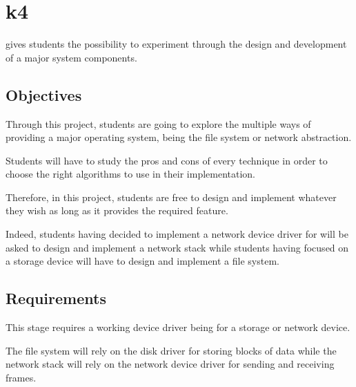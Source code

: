 %
%
%
%
%
%

%
%

\chapter{k4}
\label{chapter:k4}

 gives students the possibility to experiment through the design
and development of a major system components.

\newpage

%
%

%
%

\section{Objectives}

Through this project, students are going to explore the multiple ways of
providing a major operating system, being the file system or network
abstraction.

Students will have to study the pros and cons of every technique in order to
choose the right algorithms to use in their implementation.

Therefore, in this project, students are free to design and implement whatever
they wish as long as it provides the required feature.

Indeed, students having decided to implement a network device driver for
 will be asked to design and implement a network stack while students
having focused on a storage device will have to design and implement a file
system.

%
%

\section{Requirements}

This stage requires a working device driver being for a storage or network
device.

The file system will rely on the disk driver for storing blocks of data while
the network stack will rely on the network device driver for sending and
receiving  frames.

